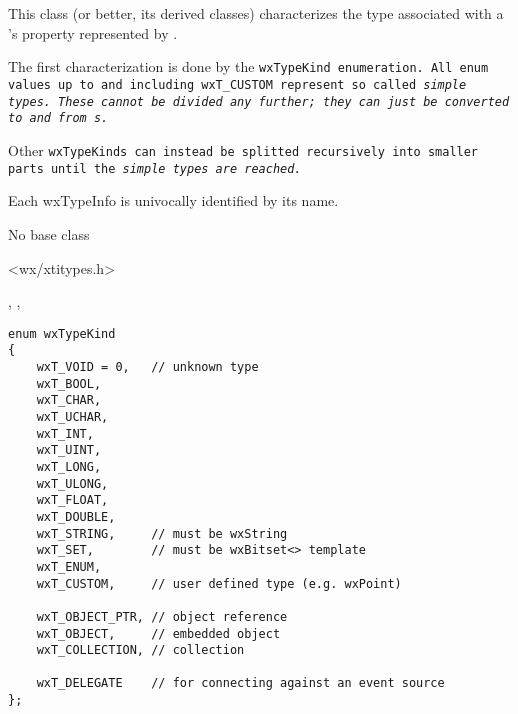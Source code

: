 

\section{}\label{wxtypeinfo}

This class (or better, its derived classes) characterizes the type associated with a 
's property represented by .

The first characterization is done by the \tt{wxTypeKind} enumeration. 
All enum values up to and including wxT_CUSTOM represent so called \it{simple} types. 
These cannot be divided any further; they can just be converted to and from s.

Other \tt{wxTypeKind}s can instead be splitted recursively into smaller parts until
the \it{simple} types are reached.

Each wxTypeInfo is univocally identified by its name.



No base class


<wx/xtitypes.h>




, , 


{\small
\begin{verbatim}
enum wxTypeKind
{
    wxT_VOID = 0,   // unknown type
    wxT_BOOL,
    wxT_CHAR,
    wxT_UCHAR,
    wxT_INT,
    wxT_UINT,
    wxT_LONG,
    wxT_ULONG,
    wxT_FLOAT,
    wxT_DOUBLE,
    wxT_STRING,     // must be wxString
    wxT_SET,        // must be wxBitset<> template
    wxT_ENUM,
    wxT_CUSTOM,     // user defined type (e.g. wxPoint)

    wxT_OBJECT_PTR, // object reference
    wxT_OBJECT,     // embedded object
    wxT_COLLECTION, // collection

    wxT_DELEGATE    // for connecting against an event source
};
\end{verbatim}
}


